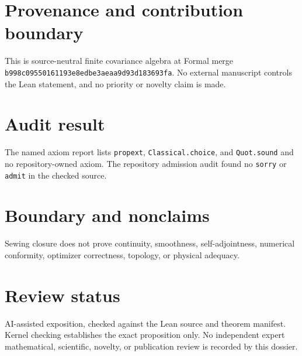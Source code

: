 \documentclass[11pt]{article}
\begin{document}
\section{Provenance and contribution boundary}
This is source-neutral finite covariance algebra at Formal merge
\texttt{b998c09550161193e8edbe3aeaa9d93d183693fa}. No external manuscript controls the Lean
statement, and no priority or novelty claim is made.

\section{Audit result}
The named axiom report lists \texttt{propext}, \texttt{Classical.choice}, and
\texttt{Quot.sound} and no repository-owned axiom. The repository admission audit found no
\texttt{sorry} or \texttt{admit} in the checked source.

\section{Boundary and nonclaims}
Sewing closure does not prove continuity, smoothness, self-adjointness, numerical conformity,
optimizer correctness, topology, or physical adequacy.

\section{Review status}
AI-assisted exposition, checked against the Lean source and theorem manifest. Kernel checking
establishes the exact proposition only. No independent expert mathematical, scientific,
novelty, or publication review is recorded by this dossier.
\end{document}
